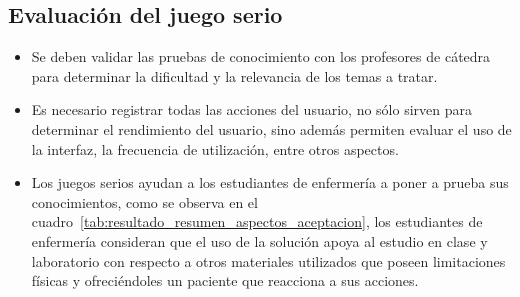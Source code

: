 \subsection{Evaluación del juego serio}

\begin{itemize}

\item Se deben validar las pruebas de conocimiento con los profesores de cátedra para
    determinar la dificultad y la relevancia de los temas a tratar.

\item Es necesario registrar todas las acciones del usuario, no sólo sirven para
    determinar el rendimiento del usuario, sino además permiten evaluar el uso
    de la interfaz, la frecuencia de utilización, entre otros aspectos.

\item Los juegos serios ayudan a los estudiantes de enfermería a poner a prueba
    sus conocimientos, como se observa en el
    cuadro~\ref{tab:resultado_resumen_aspectos_aceptacion}, los estudiantes de
    enfermería consideran que el uso de la solución apoya al estudio en clase y
    laboratorio con respecto a otros materiales utilizados que poseen
    limitaciones físicas y ofreciéndoles un paciente que reacciona a sus
    acciones. 

\end{itemize}

